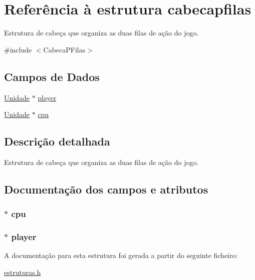 \hypertarget{structcabecapfilas}{\section{\-Referência à estrutura cabecapfilas}
\label{structcabecapfilas}
}


\-Estrutura de cabeça que organiza as duas filas de ação do jogo.  




{\ttfamily \#include $<$\-Cabeca\-P\-Filas$>$}

\subsection*{\-Campos de \-Dados}
\begin{DoxyCompactItemize}
\item 
\hyperlink{estruturas_8h_a0ebbe6457da14a6f9da4407e7c3f4b67}{\-Unidade} $\ast$ \hyperlink{structcabecapfilas_a62974e000e6746f21eb4f0e6e12238f6}{player}
\item 
\hyperlink{estruturas_8h_a0ebbe6457da14a6f9da4407e7c3f4b67}{\-Unidade} $\ast$ \hyperlink{structcabecapfilas_a5965ee42bad2e06d6187976980334f80}{cpu}
\end{DoxyCompactItemize}


\subsection{\-Descrição detalhada}
\-Estrutura de cabeça que organiza as duas filas de ação do jogo. 

\subsection{\-Documentação dos campos e atributos}
\hypertarget{structcabecapfilas_a5965ee42bad2e06d6187976980334f80}{
\subsubsection[{cpu}]{$\ast$ {\bf cpu}}}\label{structcabecapfilas_a5965ee42bad2e06d6187976980334f80}
\hypertarget{structcabecapfilas_a62974e000e6746f21eb4f0e6e12238f6}{
\subsubsection[{player}]{$\ast$ {\bf player}}}\label{structcabecapfilas_a62974e000e6746f21eb4f0e6e12238f6}


\-A documentação para esta estrutura foi gerada a partir do seguinte ficheiro\-:\begin{DoxyCompactItemize}
\item 
\hyperlink{estruturas_8h}{estruturas.\-h}\end{DoxyCompactItemize}
